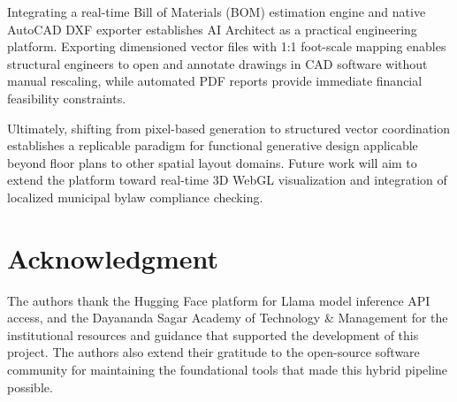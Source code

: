 \documentclass[10pt, twocolumn, letterpaper]{article}
\begin{document}
Integrating a real-time Bill of Materials (BOM) estimation engine and native
AutoCAD DXF exporter establishes AI Architect as a practical engineering platform.
Exporting dimensioned vector files with 1:1 foot-scale mapping enables structural
engineers to open and annotate drawings in CAD software without manual rescaling,
while automated PDF reports provide immediate financial feasibility constraints.

Ultimately, shifting from pixel-based generation to structured vector coordination establishes a replicable paradigm for functional generative design applicable beyond floor plans to other spatial layout domains. Future work will aim to extend the platform toward real-time 3D WebGL visualization and integration of localized municipal bylaw compliance checking.

\section*{Acknowledgment}
The authors thank the Hugging Face platform for Llama model inference API access, and the Dayananda Sagar Academy of Technology \& Management for the institutional resources and guidance that supported the development of this project. The authors also extend their gratitude to the open-source software community for maintaining the foundational tools that made this hybrid pipeline possible.
\end{document}
